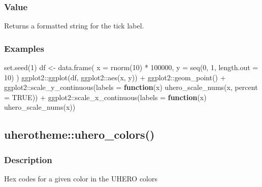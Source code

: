 \documentclass[
  letterpaper,
  DIV=11,
  numbers=noendperiod]{scrreport}
\newenvironment{Shaded}{\begin{snugshade}}{\end{snugshade}}
\newcommand{\AttributeTok}[1]{\textcolor[rgb]{0.40,0.45,0.13}{#1}}
\newcommand{\ConstantTok}[1]{\textcolor[rgb]{0.56,0.35,0.01}{#1}}
\newcommand{\ControlFlowTok}[1]{\textcolor[rgb]{0.00,0.23,0.31}{\textbf{#1}}}
\newcommand{\DecValTok}[1]{\textcolor[rgb]{0.68,0.00,0.00}{#1}}
\newcommand{\FunctionTok}[1]{\textcolor[rgb]{0.28,0.35,0.67}{#1}}
\newcommand{\NormalTok}[1]{\textcolor[rgb]{0.00,0.23,0.31}{#1}}
\newcommand{\OtherTok}[1]{\textcolor[rgb]{0.00,0.23,0.31}{#1}}
\newcommand{\SpecialCharTok}[1]{\textcolor[rgb]{0.37,0.37,0.37}{#1}}
\begin{document}
\subsubsection{Value}\label{value-67}

Returns a formatted string for the tick label.

\subsubsection{Examples}\label{examples-70}

\begin{Shaded}
\begin{Highlighting}[]
\FunctionTok{set.seed}\NormalTok{(}\DecValTok{1}\NormalTok{)}
\NormalTok{df }\OtherTok{\textless{}{-}} \FunctionTok{data.frame}\NormalTok{(}
  \AttributeTok{x =} \FunctionTok{rnorm}\NormalTok{(}\DecValTok{10}\NormalTok{) }\SpecialCharTok{*} \DecValTok{100000}\NormalTok{,}
  \AttributeTok{y =} \FunctionTok{seq}\NormalTok{(}\DecValTok{0}\NormalTok{, }\DecValTok{1}\NormalTok{, }\AttributeTok{length.out =} \DecValTok{10}\NormalTok{)}
\NormalTok{)}
\NormalTok{ggplot2}\SpecialCharTok{::}\FunctionTok{ggplot}\NormalTok{(df, ggplot2}\SpecialCharTok{::}\FunctionTok{aes}\NormalTok{(x, y)) }\SpecialCharTok{+}\NormalTok{ ggplot2}\SpecialCharTok{::}\FunctionTok{geom\_point}\NormalTok{() }\SpecialCharTok{+}
\NormalTok{ggplot2}\SpecialCharTok{::}\FunctionTok{scale\_y\_continuous}\NormalTok{(}\AttributeTok{labels =} \ControlFlowTok{function}\NormalTok{(x) }\FunctionTok{uhero\_scale\_nums}\NormalTok{(x, }\AttributeTok{percent =} \ConstantTok{TRUE}\NormalTok{)) }\SpecialCharTok{+}
\NormalTok{ggplot2}\SpecialCharTok{::}\FunctionTok{scale\_x\_continuous}\NormalTok{(}\AttributeTok{labels =} \ControlFlowTok{function}\NormalTok{(x) }\FunctionTok{uhero\_scale\_nums}\NormalTok{(x))}
\end{Highlighting}
\end{Shaded}

\subsection{uherotheme::uhero\_colors()}\label{uherothemeuhero_colors}

\subsubsection{Description}\label{description-71}

Hex codes for a given color in the UHERO colors
\end{document}
